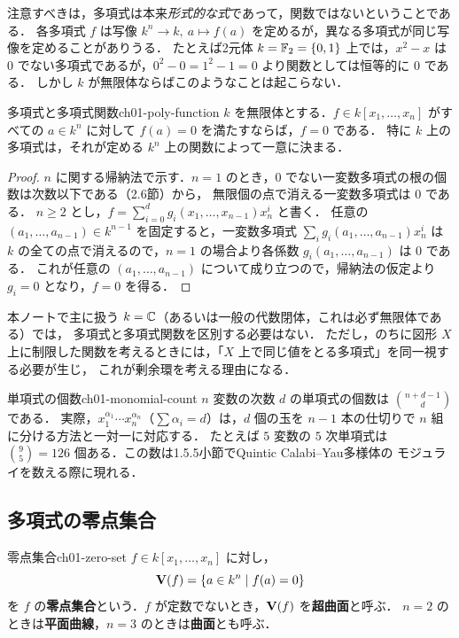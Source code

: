 注意すべきは，多項式は本来\emph{形式的な式}であって，関数ではないということである．
各多項式 $f$ は写像 $k^n\to k,\ a\mapsto f(a)$ を定めるが，異なる多項式が同じ写像を定めることがありうる．
たとえば2元体 $k=\mathbb{F}_2=\{0,1\}$ 上では，$x^2-x$ は $0$ でない多項式であるが，$0^2-0=1^2-1=0$ より関数としては恒等的に $0$ である．
しかし $k$ が無限体ならばこのようなことは起こらない．

\begin{myprop}{多項式と多項式関数}{ch01-poly-function}
$k$ を無限体とする．$f\in k[x_1,\dots,x_n]$ がすべての $a\in k^n$ に対して $f(a)=0$ を満たすならば，$f=0$ である．
特に $k$ 上の多項式は，それが定める $k^n$ 上の関数によって一意に決まる．
\end{myprop}

\begin{proof}
$n$ に関する帰納法で示す．$n=1$ のとき，$0$ でない一変数多項式の根の個数は次数以下である（2.6節）から，
無限個の点で消える一変数多項式は $0$ である．
$n\ge2$ とし，$f=\sum_{i=0}^d g_i(x_1,\dots,x_{n-1})x_n^i$ と書く．
任意の $(a_1,\dots,a_{n-1})\in k^{n-1}$ を固定すると，一変数多項式 $\sum_i g_i(a_1,\dots,a_{n-1})x_n^i$ は
$k$ の全ての点で消えるので，$n=1$ の場合より各係数 $g_i(a_1,\dots,a_{n-1})$ は $0$ である．
これが任意の $(a_1,\dots,a_{n-1})$ について成り立つので，帰納法の仮定より $g_i=0$ となり，$f=0$ を得る．
\end{proof}

本ノートで主に扱う $k=\mathbb{C}$（あるいは一般の代数閉体，これは必ず無限体である）では，
多項式と多項式関数を区別する必要はない．
ただし，のちに図形 $X$ 上に制限した関数を考えるときには，「$X$ 上で同じ値をとる多項式」を同一視する必要が生じ，
これが剰余環を考える理由になる．

\begin{myex}{単項式の個数}{ch01-monomial-count}
$n$ 変数の次数 $d$ の単項式の個数は $\binom{n+d-1}{d}$ である．
実際，$x_1^{\alpha_1}\cdots x_n^{\alpha_n}$（$\sum\alpha_i=d$）は，$d$ 個の玉を $n-1$ 本の仕切りで $n$ 組に分ける方法と一対一に対応する．
たとえば $5$ 変数の $5$ 次単項式は $\binom{9}{5}=126$ 個ある．この数は1.5.5小節でQuintic Calabi--Yau多様体の
モジュライを数える際に現れる．
\end{myex}

\subsection{多項式の零点集合}

\begin{mydef}{零点集合}{ch01-zero-set}
$f\in k[x_1,\dots,x_n]$ に対し，
\[
  \mathbf{V}(f)=\{a\in k^n\mid f(a)=0\}
\]
を $f$ の\textbf{零点集合}という．$f$ が定数でないとき，$\mathbf{V}(f)$ を\textbf{超曲面}と呼ぶ．
$n=2$ のときは\textbf{平面曲線}，$n=3$ のときは\textbf{曲面}とも呼ぶ．
\end{mydef}

